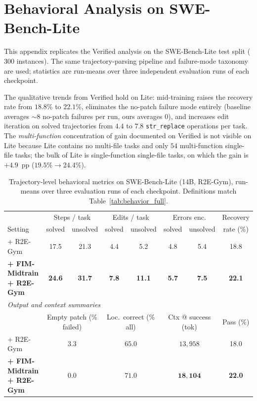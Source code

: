 \section{Behavioral Analysis on SWE-Bench-Lite}
\label{app:behavior_lite}

This appendix replicates the Verified analysis on the SWE-Bench-Lite
test split ($300$ instances). The same trajectory-parsing pipeline and
failure-mode taxonomy are used; statistics are run-means over three
independent evaluation runs of each checkpoint.

The qualitative trends from Verified hold on Lite: mid-training raises
the recovery rate from $18.8\%$ to $22.1\%$, eliminates the no-patch
failure mode entirely (baseline averages $\sim\!8$ no-patch failures
per run, ours averages $0$), and increases edit iteration on solved
trajectories from $4.4$ to $7.8$ \texttt{str\_replace} operations per
task. The \emph{multi-function} concentration of gain documented on
Verified is not visible on Lite because Lite contains no multi-file
tasks and only $54$ multi-function single-file tasks; the bulk of Lite
is single-function single-file tasks, on which the gain is
$+4.9$~pp ($19.5\%\!\to\!24.4\%$).

\begin{table}[h]
\centering
\caption{Trajectory-level behavioral metrics on SWE-Bench-Lite (14B,
R2E-Gym), run-means over three evaluation runs of each checkpoint.
Definitions match Table~\ref{tab:behavior_full}.}
\label{tab:behavior_lite}
\small
\setlength{\tabcolsep}{4pt}
\begin{tabular}{l c c c c c c c}
\toprule
& \multicolumn{2}{c}{Steps / task}
& \multicolumn{2}{c}{Edits / task}
& \multicolumn{2}{c}{Errors enc.}
& Recovery \\
\cmidrule(lr){2-3}\cmidrule(lr){4-5}\cmidrule(lr){6-7}
Setting & solved & unsolved & solved & unsolved & solved & unsolved & rate (\%) \\
\midrule
+ R2E-Gym
  & 17.5 & 21.3 & 4.4 & 5.2 & 4.8 & 5.4 & 18.8 \\
\textbf{+ FIM-Midtrain + R2E-Gym}
  & \textbf{24.6} & \textbf{31.7} & \textbf{7.8} & \textbf{11.1}
  & \textbf{5.7} & \textbf{7.5} & \textbf{22.1} \\
\midrule
\multicolumn{8}{l}{\textit{Output and context summaries}} \\
\midrule
& \multicolumn{2}{c}{Empty patch (\% failed)}
& \multicolumn{2}{c}{Loc.\ correct (\% all)}
& \multicolumn{2}{c}{Ctx @ success (tok)}
& Pass (\%) \\
\cmidrule(lr){2-3}\cmidrule(lr){4-5}\cmidrule(lr){6-7}
+ R2E-Gym
  & \multicolumn{2}{c}{$3.3$} & \multicolumn{2}{c}{$65.0$}
  & \multicolumn{2}{c}{$13{,}958$} & 18.0 \\
\textbf{+ FIM-Midtrain + R2E-Gym}
  & \multicolumn{2}{c}{$\mathbf{0.0}$} & \multicolumn{2}{c}{$\mathbf{71.0}$}
  & \multicolumn{2}{c}{$\mathbf{18{,}104}$} & \textbf{22.0} \\
\bottomrule
\end{tabular}
\end{table}

